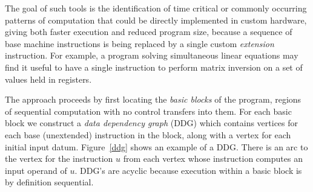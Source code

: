 \documentclass[11pt]{article}
\newcommand{\2}{\vspace{0.2 cm}}
\begin{document}
The goal of such tools is the identification of time critical or
commonly occurring patterns of computation that could be directly
implemented in custom hardware, giving both faster execution and
reduced program size, because a sequence of base machine
instructions is being replaced by a single custom {\em extension}
instruction. For example, a program solving simultaneous linear
equations may find it useful to have a single instruction to perform
matrix inversion on a set of values held in registers.



The approach proceeds by first locating the {\em basic blocks} of
the program, regions of sequential computation with no control
transfers into them. For each basic block we construct a {\em data
dependency graph} (DDG) which contains vertices for each base
(unextended) instruction in the block, along with a vertex for each
initial input datum. Figure~\ref{ddg} shows an example of a DDG.
There is an arc to the vertex for the instruction $u$ from each
vertex whose instruction computes an input operand of $u$. DDG's are
acyclic because execution within a basic block is by definition
sequential.
\end{document}
